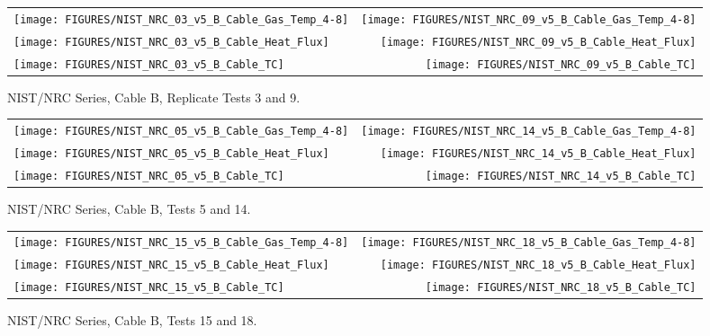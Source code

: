 \begin{figure}[h]
\begin{tabular*}{\textwidth}{l@{\extracolsep{\fill}}r}
\texttt{[image: FIGURES/NIST\_NRC\_03\_v5\_B\_Cable\_Gas\_Temp\_4-8]} &
\texttt{[image: FIGURES/NIST\_NRC\_09\_v5\_B\_Cable\_Gas\_Temp\_4-8]} \\
\texttt{[image: FIGURES/NIST\_NRC\_03\_v5\_B\_Cable\_Heat\_Flux]} &
\texttt{[image: FIGURES/NIST\_NRC\_09\_v5\_B\_Cable\_Heat\_Flux]} \\
\texttt{[image: FIGURES/NIST\_NRC\_03\_v5\_B\_Cable\_TC]} &
\texttt{[image: FIGURES/NIST\_NRC\_09\_v5\_B\_Cable\_TC]}
\end{tabular*}
\caption{NIST/NRC Series, Cable B, Replicate Tests 3 and 9.}
\label{NIST_NRC_B_3_and_9}
\end{figure}

\begin{figure}[h]
\begin{tabular*}{\textwidth}{l@{\extracolsep{\fill}}r}
\texttt{[image: FIGURES/NIST\_NRC\_05\_v5\_B\_Cable\_Gas\_Temp\_4-8]} &
\texttt{[image: FIGURES/NIST\_NRC\_14\_v5\_B\_Cable\_Gas\_Temp\_4-8]} \\
\texttt{[image: FIGURES/NIST\_NRC\_05\_v5\_B\_Cable\_Heat\_Flux]} &
\texttt{[image: FIGURES/NIST\_NRC\_14\_v5\_B\_Cable\_Heat\_Flux]} \\
\texttt{[image: FIGURES/NIST\_NRC\_05\_v5\_B\_Cable\_TC]} &
\texttt{[image: FIGURES/NIST\_NRC\_14\_v5\_B\_Cable\_TC]}
\end{tabular*}
\caption{NIST/NRC Series, Cable B, Tests 5 and 14.}
\label{NIST_NRC_B_5_and_14}
\end{figure}

\begin{figure}[h]
\begin{tabular*}{\textwidth}{l@{\extracolsep{\fill}}r}
\texttt{[image: FIGURES/NIST\_NRC\_15\_v5\_B\_Cable\_Gas\_Temp\_4-8]} &
\texttt{[image: FIGURES/NIST\_NRC\_18\_v5\_B\_Cable\_Gas\_Temp\_4-8]} \\
\texttt{[image: FIGURES/NIST\_NRC\_15\_v5\_B\_Cable\_Heat\_Flux]} &
\texttt{[image: FIGURES/NIST\_NRC\_18\_v5\_B\_Cable\_Heat\_Flux]} \\
\texttt{[image: FIGURES/NIST\_NRC\_15\_v5\_B\_Cable\_TC]} &
\texttt{[image: FIGURES/NIST\_NRC\_18\_v5\_B\_Cable\_TC]}
\end{tabular*}
\caption{NIST/NRC Series, Cable B, Tests 15 and 18.}
\label{NIST_NRC_B_15_and_18}
\end{figure}


\clearpage




